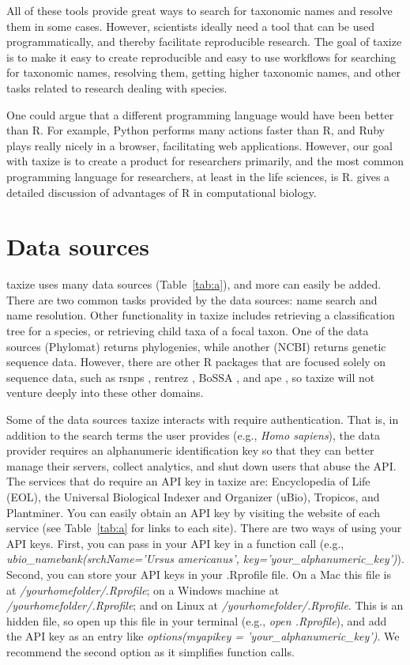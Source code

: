 \documentclass[10pt]{article}\usepackage{graphicx, color}
\begin{document}
All of these tools provide great ways to search for taxonomic names and resolve them in some cases. However, scientists ideally need a tool that can be used programmatically, and thereby facilitate reproducible research. The goal of taxize is to make it easy to create reproducible and easy to use workflows for searching for taxonomic names, resolving them, getting higher taxonomic names, and other tasks related to research dealing with species. 

One could argue that a different programming language would have been better than R. For example, Python performs many actions faster than R, and Ruby plays really nicely in a browser, facilitating web applications. However, our goal with taxize is to create a product for researchers primarily, and the most common programming language for researchers, at least in the life sciences, is R. \cite{gentleman_bioconductor:_2004} gives a detailed discussion of advantages of R in computational biology.

\section*{Data sources}
taxize uses many data sources (Table~\ref{tab:a}), and more can easily be added. There are two common tasks provided by the data sources: name search and name resolution. Other functionality in taxize includes retrieving a classification tree for a species, or retrieving child taxa of a focal taxon. One of the data sources (Phylomat) returns phylogenies, while another (NCBI) returns genetic sequence data. However, there are other R packages that are focused solely on sequence data, such as rsnps \cite{chamberlain2013}, rentrez \cite{winter2013}, BoSSA \cite{lefeuvre2010}, and ape \cite{paradis2004}, so taxize will not venture deeply into these other domains. 

Some of the data sources taxize interacts with require authentication. That is, in addition to the search terms the user provides (e.g., \emph{Homo sapiens}), the data provider requires an alphanumeric identification key so that they can better manage their servers, collect analytics, and shut down users that abuse the API. The services that do require an API key in taxize are: Encyclopedia of Life (EOL), the Universal Biological Indexer and Organizer (uBio), Tropicos, and Plantminer. You can easily obtain an API key by visiting the website of each service (see Table~\ref{tab:a} for links to each site). There are two ways of using your API keys. First, you can pass in your API key in a function call (e.g., \emph{ubio\_namebank(srchName='Ursus americanus', key='your\_alphanumeric\_key')}). Second, you can store your API keys in your .Rprofile file. On a Mac this file is at \emph{/yourhomefolder/.Rprofile}; on a Windows machine at \emph{/yourhomefolder/.Rprofile}; and on Linux at \emph{/yourhomefolder/.Rprofile}. This is an hidden file, so open up this file in your terminal (e.g., \emph{open .Rprofile}), and add the API key as an entry like \emph{options(myapikey = 'your\_alphanumeric\_key')}. We recommend the second option as it simplifies function calls. 
\end{document}
